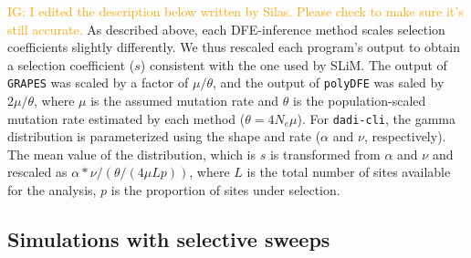 \documentclass[hidelinks]{article}
\newcommand{\polydfe}{\texttt{polyDFE}\xspace}
\newcommand{\dadicli}{\texttt{dadi-cli}\xspace}
\newcommand{\grapes}{\texttt{GRAPES}\xspace}
\newcommand{\igcomment}[1]{\textcolor{orange}{IG: #1}}
\begin{document}
    \igcomment{I edited the description below written by Silas. Please check to make sure it's still accurate.}
    As described above, each DFE-inference method scales selection coefficients slightly differently.
    We thus rescaled each program's output to obtain a selection coefficient ($s$) consistent with the one used by SLiM.
    The output of \grapes  was scaled by a factor of  $\mu / \theta$,
    and the output of \polydfe was saled by $2 \mu / \theta$, 
    where $\mu$ is the assumed mutation rate and 
    $\theta$ is the population-scaled mutation rate estimated by each method ($\theta = 4N_{e}\mu$).
    For \dadicli, the gamma distribution is parameterized using the shape and rate ($\alpha$ and $\nu$, respectively). 
    The mean value of the distribution, which is $s$ is transformed from $\alpha$ and $\nu$ and rescaled as $\alpha * \nu / (\theta / (4 \mu L p))$,
    where $L$ is the total number of sites available for the analysis,
    $p$ is the proportion of sites under selection.



    \subsection*{Simulations with selective sweeps}
\end{document}
